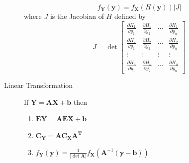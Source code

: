 \documentclass[10pt,landscape]{article}
\begin{document}
\begin{multicols*}{3}
\begin{description}
            \[
                f_{\mathbf{Y}}(\mathbf{y})=f_{\mathbf{X}}(H(\mathbf{y}))|J|
            \]
            where $J$ is the Jacobian of $H$ defined by
            \[
                J=\det \left[\begin{array}{cccc}
                                 \frac{\partial H_{1}}{\partial y_{1}} & \frac{\partial H_{1}}{\partial y_{2}} & \cdots & \frac{\partial H_{1}}{\partial y_{n}} \\
                                 \frac{\partial H_{2}}{\partial y_{1}} & \frac{\partial H_{2}}{\partial y_{2}} & \cdots & \frac{\partial H_{2}}{\partial y_{n}} \\
                                 \vdots                                & \vdots                                & \vdots & \vdots                                \\
                                 \frac{\partial H_{n}}{\partial y_{1}} & \frac{\partial H_{n}}{\partial y_{2}} & \cdots & \frac{\partial H_{n}}{\partial y_{n}}
                \end{array}\right]
            \]
            \item[Linear Transformation] If $\mathbf{Y} = \mathbf{AX + b}$ then
            \begin{enumerate}
                \item $\mathbf{EY} = \mathbf{AEX + b}$
                \item $\mathbf{C}_{\mathbf{Y}}=\mathbf{A} \mathbf{C}_{\mathbf{X}} \mathbf{A}^{\mathbf{T}}$
                \item $f_{\mathbf{Y}}(\mathbf{y})=\frac{1}{|\det{\mathbf{A}}|} f_{\mathbf{X}}\left(\mathbf{A}^{-1}(\mathbf{y}-\mathbf{b})\right)$
            \end{enumerate}
        \end{description}



\end{multicols*}
\end{document}
